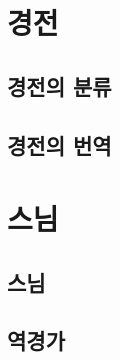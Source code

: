 \documentclass[12pt, a4paper, oneside]{book}
\let\stdsection\section
\renewcommand\section{\newpage\stdsection}
\begin{document}
	\chapter{ 경전 }
	\noptcrule

	\newpage	
	\minitoc



%
	\section{ 경전의 분류 }


%
	\section{ 경전의 번역 }






	\chapter{ 스님 }
	\noptcrule

	\newpage	
	\minitoc



%
	\section{ 스님 }


%
	\section{ 역경가 }
\end{document}

